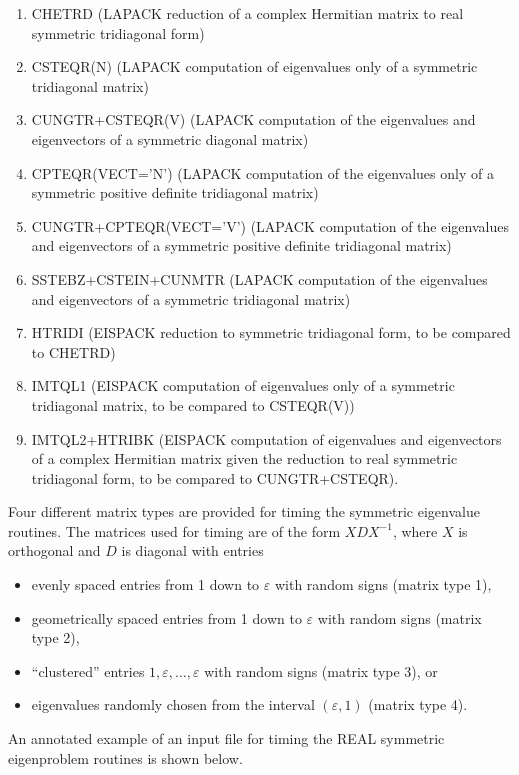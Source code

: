 \begin{enumerate}
\item CHETRD (LAPACK reduction of a complex Hermitian matrix to 
real symmetric tridiagonal form)
\item CSTEQR(N) (LAPACK computation of eigenvalues only of a symmetric
tridiagonal matrix)
\item CUNGTR+CSTEQR(V) (LAPACK computation of the eigenvalues and
eigenvectors of a symmetric diagonal matrix)
\item CPTEQR(VECT='N') (LAPACK computation of the eigenvalues only of a
symmetric positive definite tridiagonal matrix)
\item CUNGTR+CPTEQR(VECT='V') (LAPACK computation of the eigenvalues and
eigenvectors of a symmetric positive definite tridiagonal matrix)
\item SSTEBZ+CSTEIN+CUNMTR (LAPACK computation of the eigenvalues and
eigenvectors of a symmetric tridiagonal matrix) 
\item HTRIDI (EISPACK reduction to symmetric tridiagonal form, to be compared 
to CHETRD)
\item IMTQL1 (EISPACK computation of eigenvalues only of a symmetric
tridiagonal matrix, to be compared to CSTEQR(V))
\item IMTQL2+HTRIBK (EISPACK computation of eigenvalues and eigenvectors of a 
complex Hermitian matrix given the reduction to real 
symmetric tridiagonal form, to be compared to CUNGTR+CSTEQR).
\end{enumerate}

Four different matrix types are provided for timing the 
symmetric eigenvalue routines.
The matrices used for timing are of the form $XDX^{-1}$,
where $X$ is orthogonal and $D$ is diagonal with entries
\begin{itemize}
\item evenly spaced entries from 1 down to $\varepsilon$ with random signs
(matrix type 1),
\item geometrically  spaced entries from 1 down to $\varepsilon$ with random 
signs (matrix type 2),
\item ``clustered'' entries $1, \varepsilon , \ldots, \varepsilon$  with random
signs (matrix type 3), or
\item eigenvalues randomly chosen from the interval $( \varepsilon , 1 )$
(matrix type 4).
\end{itemize}


An annotated example of an input file for timing the
REAL symmetric eigenproblem routines is shown below.

